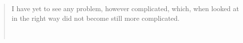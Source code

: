 \vspace*{\fill} 
\begin{quote}
\centering
 I have yet to see any problem, however complicated, which, when looked at in the right way did not become still more complicated.
 
\mylinespacing
\sourcetitle \\
\mylinespacing
\end{quote}
\vspace*{\fill}
